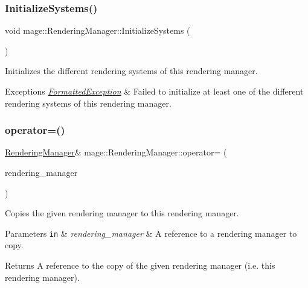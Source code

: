 \subsubsection{\texorpdfstring{Initialize\+Systems()}{InitializeSystems()}}
{\footnotesize\ttfamily void mage\+::\+Rendering\+Manager\+::\+Initialize\+Systems (\begin{DoxyParamCaption}{ }\end{DoxyParamCaption})\hspace{0.3cm}{\ttfamily [private]}}

Initializes the different rendering systems of this rendering manager.


\begin{DoxyExceptions}{Exceptions}
{\em \hyperlink{classmage_1_1_formatted_exception}{Formatted\+Exception}} & Failed to initialize at least one of the different rendering systems of this rendering manager. \\
\hline
\end{DoxyExceptions}
\hypertarget{classmage_1_1_rendering_manager_af34a5ba3b8b585124f84f4c70866546b}{}\label{classmage_1_1_rendering_manager_af34a5ba3b8b585124f84f4c70866546b} 
\subsubsection{\texorpdfstring{operator=()}{operator=()}\hspace{0.1cm}{\footnotesize\ttfamily [1/2]}}
{\footnotesize\ttfamily \hyperlink{classmage_1_1_rendering_manager}{Rendering\+Manager}\& mage\+::\+Rendering\+Manager\+::operator= (\begin{DoxyParamCaption}\item[{const \hyperlink{classmage_1_1_rendering_manager}{Rendering\+Manager} \&}]{rendering\+\_\+manager }\end{DoxyParamCaption})\hspace{0.3cm}{\ttfamily [delete]}}

Copies the given rendering manager to this rendering manager.


\begin{DoxyParams}[1]{Parameters}
\mbox{\tt in}  & {\em rendering\+\_\+manager} & A reference to a rendering manager to copy. \\
\hline
\end{DoxyParams}
\begin{DoxyReturn}{Returns}
A reference to the copy of the given rendering manager (i.\+e. this rendering manager). 
\end{DoxyReturn}
\hypertarget{classmage_1_1_rendering_manager_a6f71bc364063de61d07490ef9896158c}{}\label{classmage_1_1_rendering_manager_a6f71bc364063de61d07490ef9896158c} 
